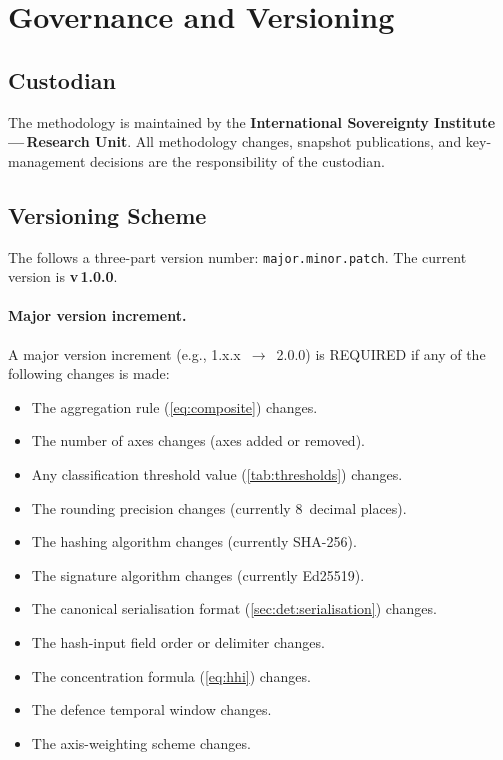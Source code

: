 \section{Governance and Versioning}\label{sec:governance}

\subsection{Custodian}\label{sec:gov:custodian}

The \ISI methodology is maintained by the \textbf{International Sovereignty
Institute\,---\,Research Unit}.  All methodology changes, snapshot
publications, and key-management decisions are the responsibility of the
custodian.

\subsection{Versioning Scheme}\label{sec:gov:versioning}

The \ISI follows a three-part version number: \texttt{major.minor.patch}.
The current version is \textbf{v\,1.0.0}.

\paragraph{Major version increment.}
A major version increment (e.g., 1.x.x~\(\to\)~2.0.0) is REQUIRED if any
of the following changes is made:

\begin{itemize}
  \item The aggregation rule (\cref{eq:composite}) changes.
  \item The number of axes changes (axes added or removed).
  \item Any classification threshold value (\cref{tab:thresholds}) changes.
  \item The rounding precision changes (currently 8~decimal places).
  \item The hashing algorithm changes (currently SHA-256).
  \item The signature algorithm changes (currently Ed25519).
  \item The canonical serialisation format
    (\cref{sec:det:serialisation}) changes.
  \item The hash-input field order or delimiter changes.
  \item The concentration formula (\cref{eq:hhi}) changes.
  \item The defence temporal window changes.
  \item The axis-weighting scheme changes.
\end{itemize}

